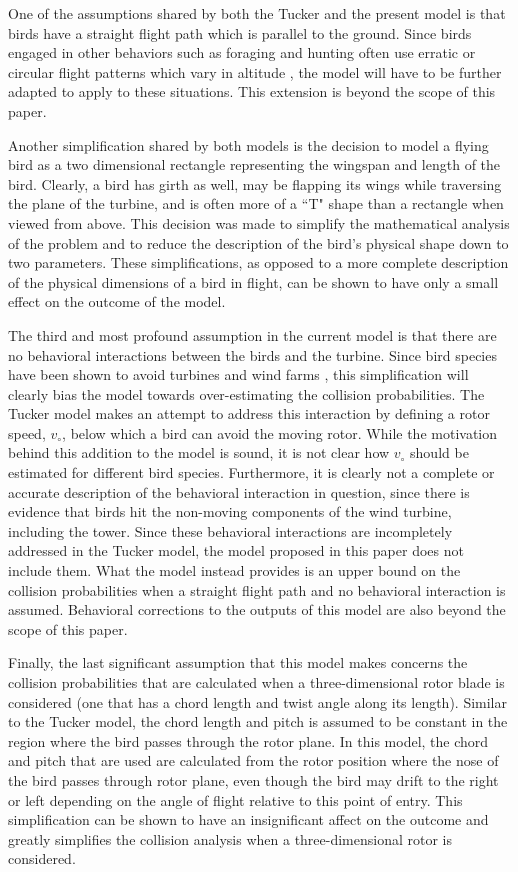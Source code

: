 \documentclass[10pt,conference]{IEEEtran}
\begin{document}
One of the assumptions shared by both the Tucker and the present model is that birds have a straight flight path which
is parallel to the ground. Since birds engaged in other behaviors such as foraging and hunting often use erratic or
circular flight patterns which vary in altitude \cite{Thalender2003}, the model will have to be further adapted to
apply to these situations. This extension is beyond the scope of this paper.

Another simplification shared by both models is the decision to model a flying bird as a two dimensional rectangle
representing the wingspan and length of the bird. Clearly, a bird has girth as well, may be flapping its wings while
traversing the plane of the turbine, and is often more of a ``T" shape than a rectangle when viewed from above. This
decision was made to simplify the mathematical analysis of the problem and to reduce the description of the bird's
physical shape down to two parameters. These simplifications, as opposed to a more complete description of the physical
dimensions of a bird in flight, can be shown to have only a small effect on the outcome of the model.

The third and most profound assumption in the current model is that there are no behavioral interactions between the
birds and the turbine. Since bird species have been shown to avoid turbines and wind farms
\cite{Kahlert2003}\cite{Chamberlain2006}, this simplification will clearly bias the model towards over-estimating the
collision probabilities. The Tucker model makes an attempt to address this interaction by defining a rotor speed,
$v_\circ$, below which a bird can avoid the moving rotor. While the motivation behind this addition to the model is
sound, it is not clear how $v_\circ$ should be estimated for different bird species. Furthermore, it is clearly not a
complete or accurate description of the behavioral interaction in question, since there is evidence that birds hit the
non-moving components of the wind turbine, including the tower. Since these behavioral interactions are incompletely
addressed in the Tucker model, the model proposed in this paper does not include them. What the model instead provides
is an upper bound on the collision probabilities when a straight flight path and no behavioral interaction is assumed.
Behavioral corrections to the outputs of this model are also beyond the scope of this paper.

Finally, the last significant assumption that this model makes concerns the collision probabilities that are calculated
when a three-dimensional rotor blade is considered (one that has a chord length and twist angle along its length).
Similar to the Tucker model, the chord length and pitch is assumed to be constant in the region where the bird passes
through the rotor plane. In this model, the chord and pitch that are used are calculated from the rotor position
where the nose of the bird passes through rotor plane, even though the bird may drift to the right or left depending
on the angle of flight relative to this point of entry. This simplification can be shown to have an insignificant
affect on the outcome and greatly simplifies the collision analysis when a three-dimensional rotor is considered.
\end{document}
